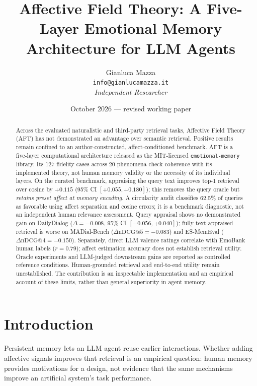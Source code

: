 \documentclass[11pt]{article}
\title{%
  \textbf{Affective Field Theory: A Five-Layer Emotional Memory\\
  Architecture for LLM Agents}
}
\author{%
  Gianluca Mazza\\
  \texttt{info@gianlucamazza.it}\\[4pt]
  \small\textit{Independent Researcher}
}
\date{October 2026 --- revised working paper}
\begin{document}
\maketitle

\begin{abstract}
Across the evaluated naturalistic and third-party retrieval tasks, Affective Field
Theory (AFT) has not demonstrated an advantage over semantic retrieval. Positive
results remain confined to an author-constructed, affect-conditioned benchmark.
AFT is a five-layer computational architecture released as the MIT-licensed
\texttt{emotional-memory} library. Its 127 fidelity cases across 20 phenomena
check coherence with its implemented theory, not human memory validity or the
necessity of its individual layers.
On the curated benchmark, appraising the query text improves top-1 retrieval over
cosine by $+0.115$ (95\% CI $[+0.055,+0.180]$); this removes the query oracle but
\emph{retains preset affect at memory encoding}. A circularity audit classifies
62.5\% of queries as favorable using affect separation and cosine errors; it is a
benchmark diagnostic, not an independent human relevance assessment.
Query appraisal shows no demonstrated gain on DailyDialog ($\Delta=-0.008$,
95\% CI $[-0.056,+0.040]$); fully text-appraised retrieval is worse on MADial-Bench
($\Delta\mathrm{nDCG@5}=-0.083$) and ES-MemEval ($\Delta\mathrm{nDCG@4}=-0.150$).
Separately, direct LLM valence ratings correlate with EmoBank human labels
($r=0.79$); affect estimation accuracy does not establish retrieval utility.
Oracle experiments and LLM-judged downstream gains are reported as controlled
reference conditions. Human-grounded retrieval and end-to-end utility remain
unestablished. The contribution is an inspectable implementation and an empirical
account of these limits, rather than general superiority in agent memory.
\end{abstract}

\section{Introduction}

Persistent memory lets an LLM agent reuse earlier interactions. Whether adding
affective signals improves that retrieval is an empirical question: human memory
provides motivations for a design, not evidence that the same mechanisms improve
an artificial system's task performance.
\end{document}
